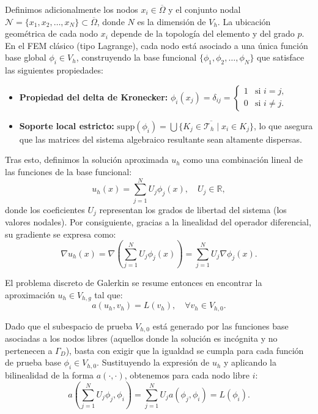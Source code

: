 \documentclass[11pt]{book}
\theoremstyle{plain} %
\theoremstyle{definition} %
\theoremstyle{definition} %
\begin{document}
\begin{itemize}
    Definimos adicionalmente los nodos $x_i \in \overline{\Omega}$ y el conjunto nodal $\mathcal{N} = \{ x_1, x_2, \dots, x_N \} \subset \overline{\Omega}$, donde $N$ es la dimensión de $V_h$. La ubicación geométrica de cada nodo $x_i$ depende de la topología del elemento y del grado $p$. En el FEM clásico (tipo Lagrange), cada nodo está asociado a una única función base global $\phi_i \in V_h$, construyendo la base funcional $\{\phi_1, \phi_2, \dots, \phi_N\}$ que satisface las siguientes propiedades:
    \begin{itemize}
        \item \textbf{Propiedad del delta de Kronecker:} $\phi_i(x_j) = \delta_{ij} = \begin{cases} 1 & \text{si } i = j, \\ 0 & \text{si } i \neq j. \end{cases}$
        \item \textbf{Soporte local estricto:} $\text{supp}(\phi_i) = \overline{\bigcup \{K_j \in \mathcal{T}_h \mid x_i \in K_j\}}$, lo que asegura que las matrices del sistema algebraico resultante sean altamente dispersas.
    \end{itemize}
\end{itemize}

Tras esto, definimos la solución aproximada $u_h$ como una combinación lineal de las funciones de la base funcional:
\begin{equation*}
    u_h(x) = \sum_{j=1}^{N} U_j \phi_j(x), \quad U_j \in \mathbb{R},
\end{equation*}
donde los coeficientes $U_j$ representan los grados de libertad del sistema (los valores nodales). Por consiguiente, gracias a la linealidad del operador diferencial, su gradiente se expresa como:
\begin{equation*}
    \nabla u_h(x) = \nabla \left( \sum_{j=1}^{N} U_j \phi_j(x) \right) = \sum_{j=1}^{N} U_j \nabla \phi_j(x).
\end{equation*}

El problema discreto de Galerkin se resume entonces en encontrar la aproximación $u_h \in V_{h,g}$ tal que:
\begin{equation*}
    a(u_h, v_h) = L(v_h), \quad \forall v_h \in V_{h,0}.
\end{equation*}

Dado que el subespacio de prueba $V_{h,0}$ está generado por las funciones base asociadas a los nodos libres (aquellos donde la solución es incógnita y no pertenecen a $\Gamma_D$), basta con exigir que la igualdad se cumpla para cada función de prueba base $\phi_i \in V_{h,0}$. Sustituyendo la expresión de $u_h$ y aplicando la bilinealidad de la forma $a(\cdot, \cdot)$, obtenemos para cada nodo libre $i$:
\begin{equation*}
    a\left( \sum_{j=1}^{N} U_j \phi_j, \phi_i \right) = \sum_{j=1}^{N} U_j a(\phi_j, \phi_i) = L(\phi_i).
\end{equation*}
\end{document}
